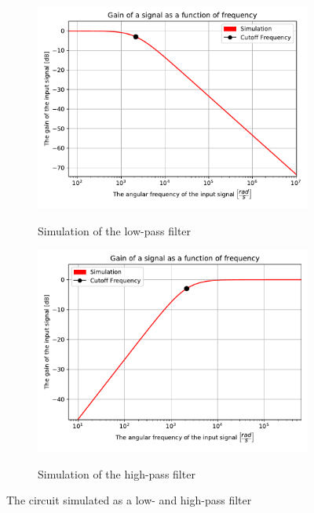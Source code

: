 \begin{figure}[htbp]
\centering
	\begin{subfigure}[b]{0.49\textwidth}
		\includegraphics[width=\textwidth]{fig/img/LPF_sim.pdf}
    		\label{fig:lpf_sim}
    		\caption{Simulation of the low-pass filter}
	\end{subfigure}
	\begin{subfigure}[b]{0.49\textwidth}
		\includegraphics[width=\textwidth]{fig/img/HPF_sim.pdf}
    		\label{fig:hpf_sim}
    		\caption{Simulation of the high-pass filter}
	\end{subfigure}
\caption{The circuit simulated as a low- and high-pass filter}
\end{figure}

